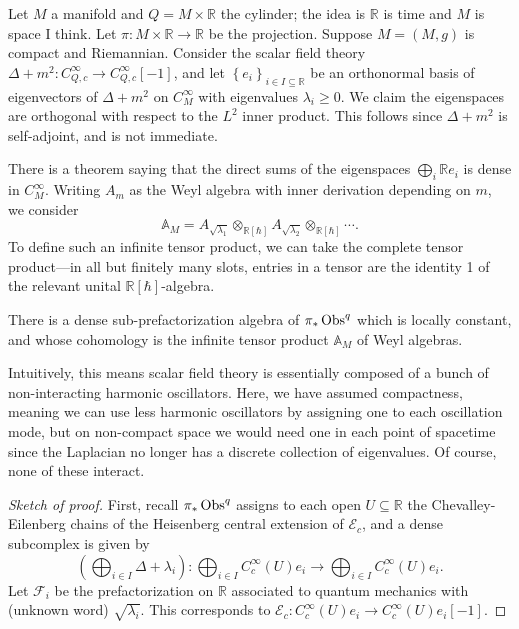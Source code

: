 \begin{example}
	Let $M$ a manifold and $Q=M\times \mathbb{R} $ the cylinder; the idea is $\mathbb{R} $ is time and $M$ is space I think. Let $\pi : M\times \mathbb{R}  \to \mathbb{R} $ be the projection. Suppose $M=(M,g)$ is compact and Riemannian. Consider the scalar field theory $\Delta +m^2 : C^\infty _{Q,c}  \to C^\infty _{Q,c}[-1] $, and let $\left\{ e_i \right\} _{i\in I\subseteq \mathbb{R} } $ be an orthonormal basis of eigenvectors of $\Delta +m^2$ on $C^\infty _M$ with eigenvalues $\lambda _i \geq 0$. We claim the eigenspaces are orthogonal with respect to the $L^2$ inner product. This follows since $\Delta +m^2$ is self-adjoint, and is not immediate.

	There is a theorem saying that the direct sums of the eigenspaces $\bigoplus_{i} \mathbb{R} e_i$ is dense in $C^\infty _M$. Writing $A_m$ as the Weyl algebra with inner derivation depending on $m$, we consider
	\[
		\mathbb{A}_M = A_{\sqrt{\lambda _1} } \otimes_{\mathbb{R} [\hbar ]} A_{\sqrt{\lambda _2} } \otimes _{\mathbb{R} [\hbar ]}\cdots  
	.\]
	To define such an infinite tensor product, we can take the complete tensor product---in all but finitely many slots, entries in a tensor are the identity 1 of the relevant unital $\mathbb{R} [\hbar ]$-algebra.

	\begin{proposition}\label{prp:6.0.5}
		There is a dense sub-prefactorization algebra of $\pi _*\operatorname{Obs}^q$ which is locally constant, and whose cohomology is the infinite tensor product $\mathbb{A} _M$ of Weyl algebras.
	\end{proposition}
	Intuitively, this means scalar field theory is essentially composed of a bunch of non-interacting harmonic oscillators. Here, we have assumed compactness, meaning we can use less harmonic oscillators by assigning one to each oscillation mode, but on non-compact space we would need one in each point of spacetime since the Laplacian no longer has a discrete collection of eigenvalues. Of course, none of these interact.
	\begin{proof}[Sketch of proof]
		First, recall $\pi _*\operatorname{Obs}^q$ assigns to each open $U\subseteq \mathbb{R} $ the Chevalley-Eilenberg chains of the Heisenberg central extension of $\mathcal{E} _c$, and a dense subcomplex is given by
		\[
			\left( \bigoplus_{i\in I} \Delta +\lambda _i \right) : \bigoplus_{i\in I} C^\infty_c(U)e_i \to \bigoplus_{i\in I} C^\infty _c(U)e_i
		.\]
		Let $\mathcal{F} _i$ be the prefactorization on $\mathbb{R} $ associated to quantum mechanics with (unknown word) $\sqrt{\lambda _i} $. This corresponds to $\mathcal{E} _c : C^\infty _c(U)e_i \to C^\infty _c(U)e_i[-1]$.


\end{proof}
\end{example}
